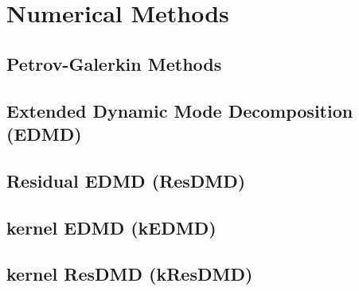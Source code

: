 
\section{Numerical Methods}

\subsection{Petrov-Galerkin Methods}

\subsection{Extended Dynamic Mode Decomposition (EDMD)}

\subsection{Residual EDMD (ResDMD)}

\subsection{kernel EDMD (kEDMD)}

\subsection{kernel ResDMD (kResDMD)}

